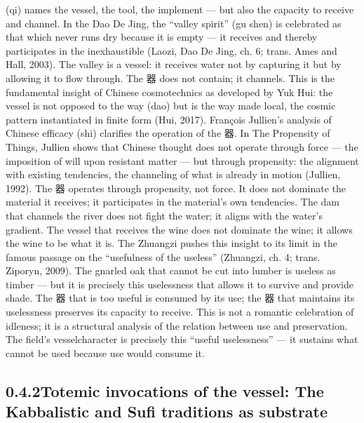 (qi) names the vessel, the tool, the implement — but also the capacity to receive and channel. In the Dao De Jing, the “valley spirit” (gu shen) is celebrated as that which never runs dry because it is empty — it receives and thereby participates in the inexhaustible (Laozi, Dao De Jing, ch. 6; trans. Ames and Hall, 2003). The valley is a vessel: it receives water not by capturing it but by allowing it to flow through. The 器 does not contain; it channels. This is the fundamental insight of Chinese cosmotechnics as developed by Yuk Hui: the vessel is not opposed to the way (dao) but is the way made local, the cosmic pattern instantiated in finite form (Hui, 2017). François Jullien’s analysis of Chinese efficacy (shi) clarifies the operation of the 器. In The Propensity of Things, Jullien shows that Chinese thought does not operate through force — the imposition of will upon resistant matter — but through propensity: the alignment with existing tendencies, the channeling of what is already in motion (Jullien, 1992). The 器 operates through propensity, not force. It does not dominate the material it receives; it participates in the material’s own tendencies. The dam that channels the river does not fight the water; it aligns with the water’s gradient. The vessel that receives the wine does not dominate the wine; it allows the wine to be what it is. The Zhuangzi pushes this insight to its limit in the famous passage on the “usefulness of the useless” (Zhuangzi, ch. 4; trans. Ziporyn, 2009). The gnarled oak that cannot be cut into lumber is useless as timber — but it is precisely this uselessness that allows it to survive and provide shade. The 器 that is too useful is consumed by its use; the 器 that maintains its uselessness preserves its capacity to receive. This is not a romantic celebration of idleness; it is a structural analysis of the relation between use and preservation. The field’s vesselcharacter is precisely this “useful uselessness” — it sustains what cannot be used because use would consume it.

\subsection{0.4.2\quad Totemic invocations of the vessel: The Kabbalistic and Sufi traditions as substrate}

